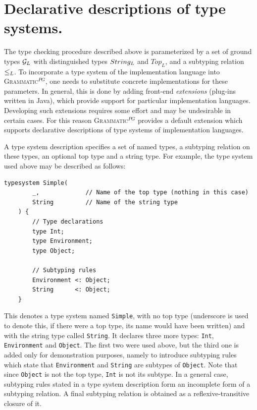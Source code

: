 \documentclass{informat} %
\newcommand{\ATF}{\textsc{Grammatic}$^{PG}$}
\begin{document}

\section{Declarative descriptions of type systems.}\label{DefaultExtension}

The type checking procedure described above is parameterized by a set of ground types ${\mathcal{G}_L}$ with distinguished types $String_L$ and $Top_L$, and a subtyping relation~$\le_L$. To incorporate a type system of the implementation language into \ATF{}, one needs to substitute concrete implementations for these parameters. In general, this is done by adding front-end \emph{extensions} (plug-ins written in Java), which provide support for particular implementation languages. Developing such extensions requires some effort and may be undesirable in certain cases. For this reason \ATF{} provides a default extension which supports declarative descriptions of type systems of implementation languages. 

A type system description specifies a set of named types, a subtyping relation on these types, an optional top type and a string type. For example, the type system used above may be described as follows:
\begin{lstlisting}[language=Typesystem]
	typesystem Simple( 
		_,             // Name of the top type (nothing in this case)
		String         // Name of the string type
	) {
		// Type declarations
		type Int;
		type Environment;
		type Object;

		// Subtyping rules
		Environment <: Object;
		String      <: Object;
	}
\end{lstlisting}
This denotes a type system named \texttt{Simple}, with no top type (underscore is used to denote this, if there were a top type, its name would have been written) and with the string type called \texttt{String}. It declares three more types: \texttt{Int}, \texttt{Environment} and \texttt{Object}. The first two were used above, but the third one is added only for demonstration purposes, namely to introduce subtyping rules which state that \texttt{Environment} and \texttt{String} are subtypes of \texttt{Object}. Note that since \texttt{Object} is not the top type, \texttt{Int} is not its subtype. In a general case, subtyping rules stated in a type system description form an incomplete form of a subtyping relation. A final subtyping relation is obtained as a reflexive-transitive closure of it.
\end{document}
